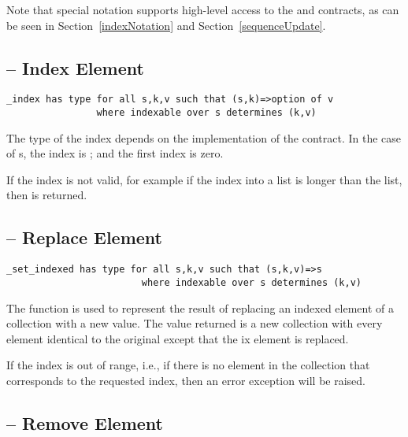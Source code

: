 \begin{aside}
Note that special notation supports high-level access to the  and  contracts, as can be seen in Section~\vref{indexNotation} and Section~\vref{sequenceUpdate}.
\end{aside}

\subsection{ -- Index Element}
\label{indexFunction}
\begin{lstlisting}
_index has type for all s,k,v such that (s,k)=>option of v
                where indexable over s determines (k,v)
\end{lstlisting}
\begin{aside}
The type of the index depends on the implementation of the contract. In the case of s, the index is ; and the first index is zero.
\end{aside}
\begin{aside}
If the index is not valid, for example if the index into a list is longer than the list, then  is returned.
\end{aside}

\subsection{ -- Replace Element}
\label{indexReplaceFunction}
\begin{lstlisting}
_set_indexed has type for all s,k,v such that (s,k,v)=>s
                        where indexable over s determines (k,v)
\end{lstlisting}
The  function is used to represent the result of replacing an indexed element of a collection with a new value. The value returned is a new collection with every element identical to the original except that the ix element is replaced.

If the index is out of range, i.e., if there is no element in the collection that corresponds to the requested index, then an error exception will be raised.

\subsection{ -- Remove Element}
\label{indexDeleteFunction}


